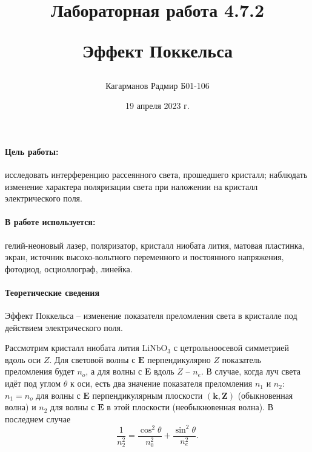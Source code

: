 \documentclass[a4paper,12pt]{article}
\title{Лабораторная работа 4.7.2

Эффект Поккельса}
\author{Кагарманов Радмир Б01-106}
\date{19 апреля 2023 г.}
\begin{document}
\maketitle
\thispagestyle{empty}
\newpage
\setcounter{page}{1}

\paragraph{Цель работы:} исследовать интерференцию рассеянного света, прошедшего кристалл; наблюдать изменение характера поляризации света при наложении на кристалл электрического поля.
\paragraph{В работе используется:} гелий-неоновый лазер, поляризатор, кристалл ниобата лития, матовая пластинка, экран, источник высоко-вольтного переменного и постоянного напряжения, фотодиод, осциоллограф, линейка.
\paragraph{Теоретические сведения\\}
Эффект Поккельса -- изменение показателя преломления света в кристалле под действием электрического поля.\par
Рассмотрим кристалл ниобата лития $\text{LiNbO}_3$ с цетрольноосевой симметрией вдоль оси $Z$. Для световой волны с $\mathbf{E}$ перпендикулярно $Z$ показатель преломления будет $n_o$, а для волны с $\mathbf{E}$ вдоль $Z$ -- $n_e$. В случае, когда луч света идёт под углом $\theta$ к оси, есть два значение показателя преломления $n_1$ и $n_2$: $n_1 = n_o$ для волны с $\mathbf{E}$ перпендикулярным плоскости $(\mathbf{k},\mathbf{Z})$ (обыкновенная волна) и $n_2$ для волны с $\mathbf{E}$ в этой плоскости (необыкновенная волна). В последнем случае
\begin{equation}
\dfrac{1}{n_2^2}=\dfrac{\cos^2 \theta}{n_0^2}+\dfrac{\sin^2 \theta}{n_e^2}.
\end{equation}
\end{document}
